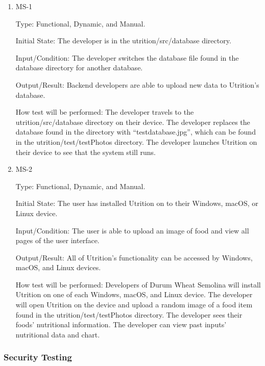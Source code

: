 \documentclass[12pt, titlepage]{article}
\begin{document}
	\begin{enumerate}
		
		\item{MS-1} 
		
		Type: Functional, Dynamic, and Manual.
		
		Initial State: The developer is in the utrition/src/database directory.
		
		Input/Condition: The developer switches the database file found in the database directory for another database.
		
		Output/Result: Backend developers are able to upload new data to Utrition’s database.
		
		How test will be performed: The developer travels to the utrition/src/database directory on their device. The developer replaces the database found in the directory with “testdatabase.jpg”, which can be found in the utrition/test/testPhotos directory. The developer launches Utrition on their device to see that the system still runs.	
		
		\item{MS-2} 
		
		Type: Functional, Dynamic, and Manual.
		
		Initial State: The user has installed Utrition on to their Windows, macOS, or Linux device.
		
		Input/Condition: The user is able to upload an image of food and view all pages of the user interface.
		
		Output/Result: All of Utrition’s functionality can be accessed by Windows, macOS, and Linux devices.
		
		How test will be performed: Developers of Durum Wheat Semolina will install Utrition on one of each Windows, macOS, and Linux device. The developer will open Utrition on the device and upload a random image of a food item found in the utrition/test/testPhotos directory. The developer sees their foods’ nutritional information. The developer can view past inputs' nutritional data and chart.
		
	\end{enumerate}
	
	\subsubsection{Security Testing}
	
	
\end{document}
